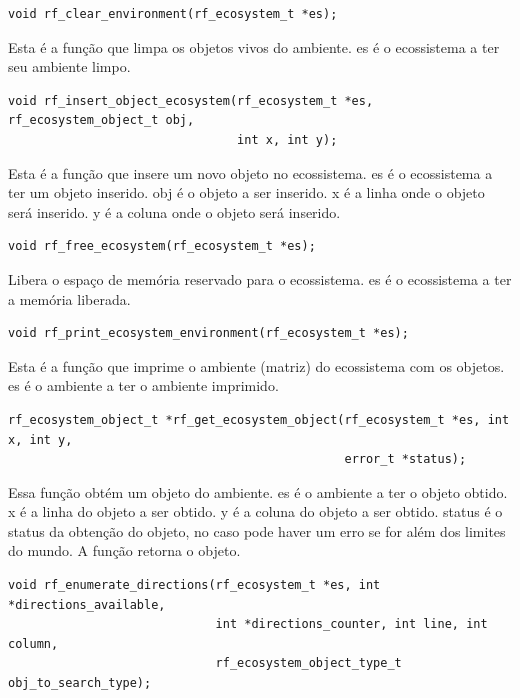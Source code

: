 \documentclass{article}
\begin{document}
\begin{verbatim}
void rf_clear_environment(rf_ecosystem_t *es);
      \end{verbatim}

Esta é a função que limpa os objetos vivos do ambiente.
es é o ecossistema a ter seu ambiente limpo.


\begin{verbatim}
void rf_insert_object_ecosystem(rf_ecosystem_t *es, rf_ecosystem_object_t obj,
                                int x, int y);
      \end{verbatim}

Esta é a função que insere um novo objeto no ecossistema.
es é o ecossistema a ter um objeto inserido.
obj é o objeto a ser inserido.
x é a linha onde o objeto será inserido.
y é a coluna onde o objeto será inserido.


\begin{verbatim}
void rf_free_ecosystem(rf_ecosystem_t *es);
      \end{verbatim}

Libera o espaço de memória reservado para o ecossistema.
es é o ecossistema a ter a memória liberada.

\begin{verbatim}
void rf_print_ecosystem_environment(rf_ecosystem_t *es);
      \end{verbatim}

Esta é a função que imprime o ambiente (matriz) do ecossistema com os objetos.
es é o ambiente a ter o ambiente imprimido.

\begin{verbatim}
rf_ecosystem_object_t *rf_get_ecosystem_object(rf_ecosystem_t *es, int x, int y,
                                               error_t *status);
      \end{verbatim}

Essa função obtém um objeto do ambiente.
es é o ambiente a ter o objeto obtido.
x é a linha do objeto a ser obtido.
y é a coluna do objeto a ser obtido.
status é o status da obtenção do objeto, no caso pode haver um erro se for além dos limites do mundo.
A função retorna o objeto.


\begin{verbatim}
void rf_enumerate_directions(rf_ecosystem_t *es, int *directions_available,
                             int *directions_counter, int line, int column,
                             rf_ecosystem_object_type_t obj_to_search_type);
      \end{verbatim}
\end{document}
